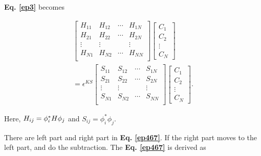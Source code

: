 \documentclass[a4paper, 12pt, titlepage,oneside,drop]{kthesis}
\begin{document}
\textbf{Eq. \ref{ep3}} becomes

\begin{equation}\begin{split}\label{ep467}
\left[
\begin{matrix}
    H_{11} & H_{12} & \cdots & H_{1N} \\
    H_{21} & H_{22} & \cdots & H_{2N} \\
    \vdots               & \vdots               &        & \vdots               \\
     H_{N1} & H_{N2} & \cdots & H_{NN} \\
\end{matrix} \right] \left[ \begin{array}{c} C_1 \\ C_2 \\ \vdots \\ C_N\end{array} \right] \\
= \epsilon^{KS} \left[
\begin{matrix}
    S_{11} & S_{12} & \cdots & S_{1N} \\
    S_{21} & S_{22} & \cdots & S_{2N} \\
    \vdots               & \vdots               &        & \vdots               \\
     S_{N1} & S_{N2} & \cdots & S_{NN} \\
\end{matrix} \right]\left[ \begin{array}{c} C_1 \\ C_2 \\ \vdots \\ C_N\end{array} \right].
\end{split}\end{equation}

Here, $H_{ij} = \phi^*_i {H} \phi_j$ and $S_{ij} = \phi^*_i \phi_j$.

There are left part and right part in \textbf{Eq. \ref{ep467}}. If the right part moves to the left part, and do the subtraction. The \textbf{Eq. \ref{ep467}} is derived as 
\end{document}
